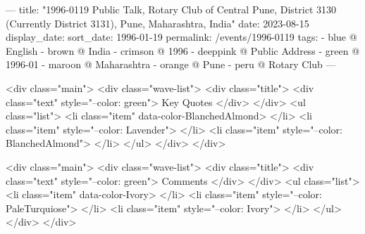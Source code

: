 ---
title: "1996-0119 Public Talk, Rotary Club of Central Pune, District 3130 (Currently District 3131), Pune, Maharashtra, India"
date: 2023-08-15
display_date: 
sort_date: 1996-01-19
permalink: /events/1996-0119
tags:
  - blue @ English
  - brown @ India
  - crimson @ 1996
  - deeppink @ Public Address
  - green @ 1996-01
  - maroon @ Maharashtra
  - orange @ Pune
  - peru @ Rotary Club
---

<div class="main">
  <div class="wave-list">
    <div class="title">
      <div class="text" style="--color: green">
        Key Quotes
      </div>
    </div>
    <ul class="list">
        <li class="item" data-color-BlanchedAlmond>
        </li>
        <li class="item" style="--color: Lavender">
        </li>
        <li class="item" style="--color: BlanchedAlmond">
        </li>
      </ul>
  </div>
</div>

<div class="main">
  <div class="wave-list">
    <div class="title">
      <div class="text" style="--color: green">
        Comments
      </div>
    </div>
    <ul class="list">
        <li class="item" data-color-Ivory>
        </li>
        <li class="item" style="--color: PaleTurquiose">
        </li>
        <li class="item" style="--color: Ivory">
        </li>
      </ul>
  </div>
</div>